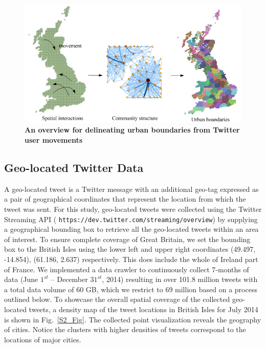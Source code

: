 \documentclass[]{tGIS2e}
\begin{document}

\begin{figure}[ht]
\begin{center}
\includegraphics[width=1\linewidth]{./figure/S1_overview_Fig_2}
\caption{\bfseries{An overview for delineating urban boundaries from Twitter user movements}}
\label{S1_Fig}
\end{center}
\end{figure}

\subsection{Geo-located Twitter Data}
A geo-located tweet is a Twitter message with an additional geo-tag expressed as a pair of geographical coordinates that represent the location from which the tweet was sent.
For this study, geo-located tweets were collected using the Twitter Streaming API (
{\tt{https://dev.twitter.com/streaming/overview}}) by supplying a geographical bounding box to retrieve all the  geo-located tweets within an area of interest. To ensure complete coverage of Great Britain, we set the bounding box to the British Isles using the lower left and upper right coordinates (49.497, -14.854), (61.186, 2.637) respectively. This does include the whole of Ireland part of France.
We implemented a data crawler to continuously collect 7-months of data (June $1^{st}$ -- December $31^{st}$, 2014) resulting in over 101.8 million tweets with a total data volume of 60 GB, which we restrict to 69 million based on a process outlined below. 
To showcase the overall spatial coverage of the collected geo-located tweets, a density map of the tweet locations in British Isles for July 2014 is shown in Fig.~\ref{S2_Fig}.
The collected point visualization reveals the geography of cities.
Notice the clusters with higher densities of tweets correspond to the locations of major cities.
\end{document}
